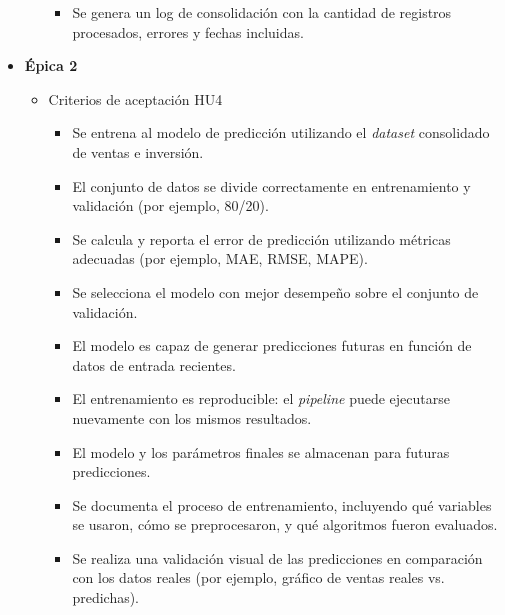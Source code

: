 \documentclass[
11pt, %
]{charter}
\begin{document}
\begin{itemize}
\begin{itemize}
\begin{itemize}
		\item Se genera un log de consolidación con la cantidad de registros procesados, errores y fechas incluidas.      
    \end{itemize}  
      
    \end{itemize}
  \item \textbf{\'{E}pica 2}
    \begin{itemize}
        
      \item Criterios de aceptación HU4
      
	\begin{itemize}
    		\item Se entrena al modelo de predicción utilizando el \textit{dataset} consolidado de ventas e inversión.

    		\item El conjunto de datos se divide correctamente en entrenamiento y validación (por ejemplo, 80/20).

    		\item Se calcula y reporta el error de predicción utilizando métricas adecuadas (por ejemplo, MAE, RMSE, MAPE).

    		\item Se selecciona el modelo con mejor desempeño sobre el conjunto de validación.

    		\item El modelo es capaz de generar predicciones futuras en función de datos de entrada recientes.

    		\item El entrenamiento es reproducible: el \textit{pipeline} puede ejecutarse nuevamente con los mismos resultados.

    		\item El modelo y los parámetros finales se almacenan para futuras predicciones.

    		\item Se documenta el proceso de entrenamiento, incluyendo qué variables se usaron, cómo se preprocesaron, y qué algoritmos fueron evaluados.

    		\item Se realiza una validación visual de las predicciones en comparación con los datos reales (por ejemplo, gráfico de ventas reales vs. predichas).
    		     
    \end{itemize}      
    \end{itemize}
    

\end{itemize}
\end{document}
